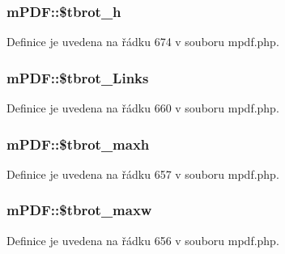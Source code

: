 \hypertarget{classm_p_d_f_aecfd87e454dabf61e8032a76e403fc33}{
\subsubsection[{\$tbrot\-\_\-h}]{\setlength{\rightskip}{0pt plus 5cm}m\-P\-D\-F\-::\$tbrot\-\_\-h}}\label{classm_p_d_f_aecfd87e454dabf61e8032a76e403fc33}


Definice je uvedena na řádku 674 v souboru mpdf.\-php.

\hypertarget{classm_p_d_f_a541fb16701b3827a5458de28cb2d051e}{
\subsubsection[{\$tbrot\-\_\-\-Links}]{\setlength{\rightskip}{0pt plus 5cm}m\-P\-D\-F\-::\$tbrot\-\_\-\-Links}}\label{classm_p_d_f_a541fb16701b3827a5458de28cb2d051e}


Definice je uvedena na řádku 660 v souboru mpdf.\-php.

\hypertarget{classm_p_d_f_af918142572c97f0877c2efad7c26ea51}{
\subsubsection[{\$tbrot\-\_\-maxh}]{\setlength{\rightskip}{0pt plus 5cm}m\-P\-D\-F\-::\$tbrot\-\_\-maxh}}\label{classm_p_d_f_af918142572c97f0877c2efad7c26ea51}


Definice je uvedena na řádku 657 v souboru mpdf.\-php.

\hypertarget{classm_p_d_f_a87b76dd4f1f6cc8f19c6135f82605965}{
\subsubsection[{\$tbrot\-\_\-maxw}]{\setlength{\rightskip}{0pt plus 5cm}m\-P\-D\-F\-::\$tbrot\-\_\-maxw}}\label{classm_p_d_f_a87b76dd4f1f6cc8f19c6135f82605965}


Definice je uvedena na řádku 656 v souboru mpdf.\-php.

